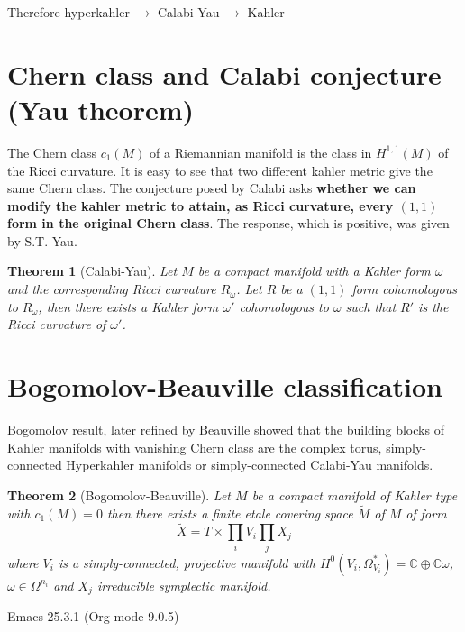 \documentclass[11pt]{article}
\newtheorem{theorem}{Theorem}
\begin{document}
Therefore hyperkahler \(\longrightarrow\) Calabi-Yau \(\longrightarrow\) Kahler

\section{Chern class and Calabi conjecture (Yau theorem)}
\label{sec:org53e8201}
The Chern class \(c_1(M)\) of a Riemannian manifold is the class in \(H^{1,1}(M)\) of the Ricci
curvature. It is easy to see that two different kahler metric give the same Chern class. The
conjecture posed by Calabi asks \textbf{whether we can modify the kahler metric to attain, as Ricci
curvature, every \((1,1)\) form in the original Chern class}. The response, which is positive, was
given by S.T. Yau.

\begin{theorem}[Calabi-Yau]
\label{org0014987}
Let \(M\) be a compact manifold with a Kahler form \(\omega\) and the corresponding Ricci curvature
\(R_\omega\). Let \(R\) be a \((1,1)\) form cohomologous to \(R_\omega\), then there exists a Kahler form
\(\omega'\) cohomologous to \(\omega\) such that \(R'\) is the Ricci curvature of \(\omega'\).
\end{theorem}



\section{Bogomolov-Beauville classification}
\label{sec:org4be41d5}

Bogomolov result, later refined by Beauville showed that the building blocks of Kahler manifolds
with vanishing Chern class are the complex torus, simply-connected Hyperkahler manifolds or
simply-connected Calabi-Yau manifolds.

\begin{theorem}[Bogomolov-Beauville]
\label{orgdda46fb}
Let \(M\) be a compact manifold of Kahler type with \(c_1(M)=0\) then there exists a finite etale
covering space \(\tilde M\) of \(M\) of form
\[
\tilde X = T\times \prod_i V_i \prod_j X_j
\]
where \(V_i\) is a simply-connected, projective manifold with \(H^0(V_i,\Omega_{V_i}^*) = \mathbb{C}
\oplus \mathbb{C}\omega\), \(\omega\in \Omega^{n_i}\) and \(X_j\) irreducible symplectic manifold.
\end{theorem}
Emacs 25.3.1 (Org mode 9.0.5)
\end{document}
